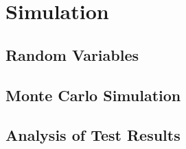 \section{Simulation}
\subsection{Random Variables}
\subsection{Monte Carlo Simulation}
\subsection{Analysis of Test Results}
\endinput